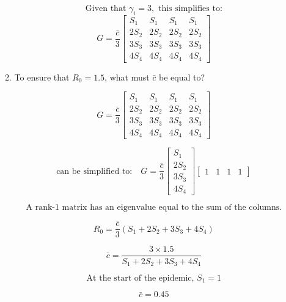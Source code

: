 \documentclass[11pt]{article}
\begin{document}
\begin{enumerate}
\begin{enumerate}[label=\alph*.]
	\[
	\text{Given that } \gamma_i = 3, \text{ this simplifies to:}
	\]
	\[
	G = 
	\dfrac{\bar{c}}{3}
	\begin{bmatrix}
	S_1 & S_1 & S_1 & S_1 \\
	2S_2 & 2S_2 & 2S_2 & 2S_2 \\
	3S_3 & 3S_3 & 3S_3 & 3S_3 \\
	4S_4 & 4S_4 & 4S_4 & 4S_4
	\end{bmatrix}
	\]

	\item To ensure that $R_0=1.5$, what must $\bar{c}$ be equal to?
	\par
	\[
	G = 
	\dfrac{\bar{c}}{3}
	\begin{bmatrix}
	S_1 & S_1 & S_1 & S_1 \\
	2S_2 & 2S_2 & 2S_2 & 2S_2 \\
	3S_3 & 3S_3 & 3S_3 & 3S_3 \\
	4S_4 & 4S_4 & 4S_4 & 4S_4
	\end{bmatrix}
	\]

	\[
	\text{can be simplified to:} \quad
	G = \dfrac{\bar{c}}{3}
	\begin{bmatrix}
	S_1 \\[0.3em]
	2S_2 \\[0.3em]
	3S_3 \\[0.3em]
	4S_4
	\end{bmatrix}
	\begin{bmatrix}
	1 & 1 & 1 & 1
	\end{bmatrix}
	\]

	\[
	\text{A rank-1 matrix has an eigenvalue equal to the sum of the columns.}
	\]

	\[
	R_0 = \dfrac{\bar{c}}{3} \left( S_1 + 2S_2 + 3S_3 + 4S_4 \right)
	\]

	\[
	\bar{c} = 
	\dfrac{3 \times 1.5}{
	S_1 + 2S_2 + 3S_3 + 4S_4
	}
	\]

	\[
	\text{At the start of the epidemic, } S_1 = 1
	\]

	\[
	\boxed{\bar{c} = 0.45}
	\]


\end{enumerate}
\end{enumerate}
\end{document}
